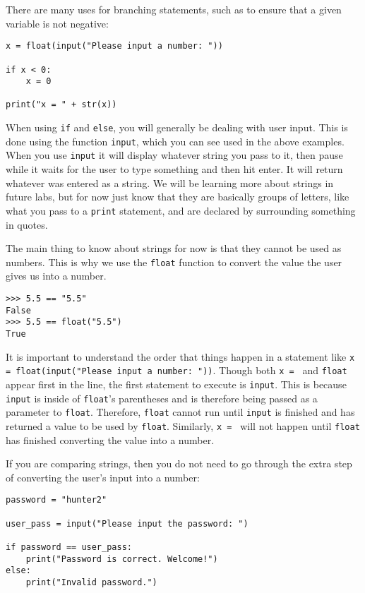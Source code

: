 \documentclass[12pt,hidelinks]{article}
\begin{document}
There are many uses for branching statements, such as to ensure that a given variable is not negative:

\begin{lstlisting}[style=python]
x = float(input("Please input a number: "))

if x < 0:
    x = 0

print("x = " + str(x))
\end{lstlisting}

When using \texttt{if} and \texttt{else}, you will generally be dealing with user input. This is done using the function \texttt{input}, which you can see used in the above examples. When you use \texttt{input} it will display whatever string you pass to it, then pause while it waits for the user to type something and then hit enter. It will return whatever was entered as a string. We will be learning more about strings in future labs, but for now just know that they are basically groups of letters, like what you pass to a \texttt{print} statement, and are declared by surrounding something in quotes.

The main thing to know about strings for now is that they cannot be used as numbers. This is why we use the \texttt{float} function to convert the value the user gives us into a number.

\begin{lstlisting}[style=python]
>>> 5.5 == "5.5"
False
>>> 5.5 == float("5.5")
True
\end{lstlisting}

It is important to understand the order that things happen in a statement like \texttt{x = float(input("Please input a number: "))}. Though both \texttt{x = } and \texttt{float} appear first in the line, the first statement to execute is \texttt{input}. This is because \texttt{input} is inside of \texttt{float}'s parentheses and is therefore being passed as a parameter to \texttt{float}. Therefore, \texttt{float} cannot run until \texttt{input} is finished and has returned a value to be used by \texttt{float}. Similarly, \texttt{x = } will not happen until \texttt{float} has finished converting the value into a number.

If you are comparing strings, then you do not need to go through the extra step of converting the user's input into a number:

\begin{lstlisting}[style=python]
password = "hunter2"

user_pass = input("Please input the password: ")

if password == user_pass:
    print("Password is correct. Welcome!")
else:
    print("Invalid password.")
\end{lstlisting}
\end{document}
